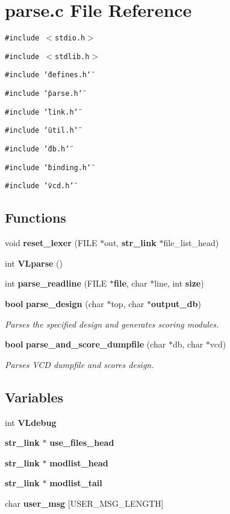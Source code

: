 \section{parse.c File Reference}
\label{parse_8c}
{\tt \#include $<$stdio.h$>$}\par
{\tt \#include $<$stdlib.h$>$}\par
{\tt \#include \char`\"{}defines.h\char`\"{}}\par
{\tt \#include \char`\"{}parse.h\char`\"{}}\par
{\tt \#include \char`\"{}link.h\char`\"{}}\par
{\tt \#include \char`\"{}util.h\char`\"{}}\par
{\tt \#include \char`\"{}db.h\char`\"{}}\par
{\tt \#include \char`\"{}binding.h\char`\"{}}\par
{\tt \#include \char`\"{}vcd.h\char`\"{}}\par
\subsection*{Functions}
\begin{CompactItemize}
\item 
void {\bf reset\_\-lexer} (FILE $\ast$out, {\bf str\_\-link} $\ast$file\_\-list\_\-head)
\item 
int {\bf VLparse} ()
\item 
int {\bf parse\_\-readline} (FILE $\ast${\bf file}, char $\ast$line, int {\bf size})
\item 
{\bf bool} {\bf parse\_\-design} (char $\ast$top, char $\ast${\bf output\_\-db})
\begin{CompactList}\small\item\em Parses the specified design and generates scoring modules.\item\end{CompactList}\item 
{\bf bool} {\bf parse\_\-and\_\-score\_\-dumpfile} (char $\ast$db, char $\ast$vcd)
\begin{CompactList}\small\item\em Parses VCD dumpfile and scores design.\item\end{CompactList}\end{CompactItemize}
\subsection*{Variables}
\begin{CompactItemize}
\item 
int {\bf VLdebug}
\item 
{\bf str\_\-link} $\ast$ {\bf use\_\-files\_\-head}
\item 
{\bf str\_\-link} $\ast$ {\bf modlist\_\-head}
\item 
{\bf str\_\-link} $\ast$ {\bf modlist\_\-tail}
\item 
char {\bf user\_\-msg} [USER\_\-MSG\_\-LENGTH]
\end{CompactItemize}


